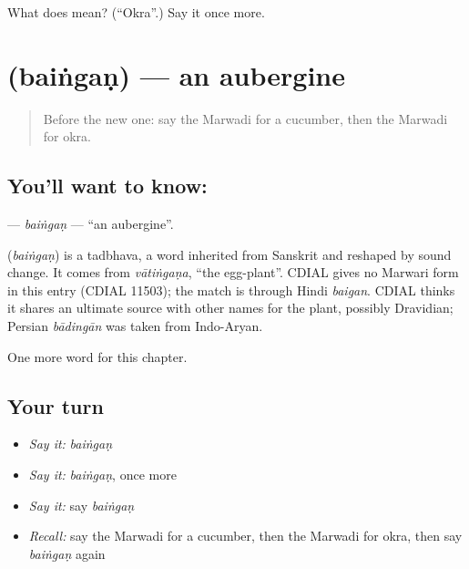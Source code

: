 \begin{tcolorbox}[breakable,colback=teal!4,colframe=teal!35!black,title={Before you move on}]
What does  mean? (\textquotedblleft{}Okra\textquotedblright{}.) Say it once more.
\end{tcolorbox}
\section[\texorpdfstring{\mw{बैंगण} (baiṅgaṇ)}{बैंगण (baiṅgaṇ)}]{ (baiṅgaṇ) — an aubergine}

\label{lesson:MW-C135-baingan}



\begin{quote}
Before the new one: say the Marwadi for a cucumber, then the Marwadi for okra.
\end{quote}

\subsection*{You'll want to know: }
\textbf{} — \emph{baiṅgaṇ} — \textquotedblleft{}an aubergine\textquotedblright{}.

\begin{cousinweb}
\textbf{} (\emph{baiṅgaṇ}) is a tadbhava, a word inherited from Sanskrit and reshaped by sound change. It comes from \emph{vātiṅgaṇa}, \textquotedblleft{}the egg-plant\textquotedblright{}. CDIAL gives no Marwari form in this entry (CDIAL 11503); the match is through Hindi \emph{baigan}. CDIAL thinks it shares an ultimate source with other names for the plant, possibly Dravidian; Persian \emph{bādingān} was taken from Indo-Aryan.
\end{cousinweb}

\begin{grammarlens}[title={What you've built}]
One more word for this chapter.
\end{grammarlens}

\subsection*{Your turn}
\begin{itemize}
\raggedright
  \item \emph{Say it:} \emph{baiṅgaṇ}
  \item \emph{Say it:} \emph{baiṅgaṇ}, once more
  \item \emph{Say it:} say \emph{baiṅgaṇ}
  \item \emph{Recall:} say the Marwadi for a cucumber, then the Marwadi for okra, then say \emph{baiṅgaṇ} again
\end{itemize}

